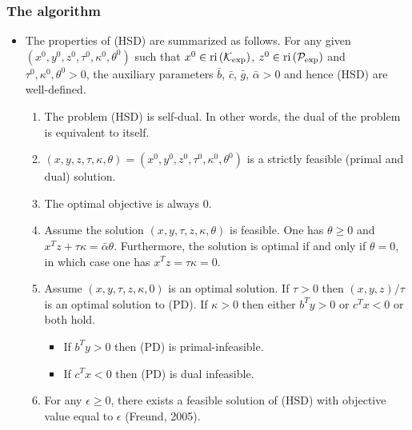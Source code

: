 \documentclass{beamer}
\def\interior{\protect{\textnormal{ri}}}
\begin{document}
\begin{frame}
	\frametitle{The algorithm}
	\begin{itemize}
		\item The properties of (HSD) are summarized as follows.
			For any given $(x^0, y^0, z^0, \tau^0, \kappa^0, \theta^0)$ such that $x^0 \in \interior \left(\mathcal{K}_{\exp}\right)$, $z^0 \in \interior \left(\mathcal{P}_{\exp}\right)$ and $\tau^0, \kappa^0, \theta^0 > 0$, the auxiliary parameters $\bar{b}$, $\bar{c}$, $\bar{g}$, $\bar{\alpha}>0$ and hence (HSD) are well-defined.
			\begin{enumerate}
				\item The problem (HSD) is \textnormal{self-dual}. In other words, the dual of the problem is equivalent to itself. 
				\item $(x,y,z,\tau,\kappa, \theta) = (x^0,y^0,z^0, \tau^0,\kappa^0, \theta^0)$ is a strictly feasible (primal and dual) solution.
				\item The optimal objective is always 0. 
				\item Assume the solution $(x,y, \tau, z,\kappa, \theta)$ is feasible. One has $\theta\geq 0$ and $x^T z + \tau \kappa = \bar{\alpha} \theta$. Furthermore, the solution is optimal if and only if $\theta=0$, in which case one has $x^T z = \tau\kappa = 0$.
				\item Assume $(x,y, \tau, z,\kappa, 0)$ is an optimal solution. If $\tau>0$ then $(x,y,z)/\tau$ is an optimal solution to (PD). If $\kappa>0$ then either $b^Ty>0$ or $c^Tx<0$ or both hold. 
				\begin{itemize}
					\item If $b^T y>0$ then (PD) is primal-infeasible.
					\item If $c^T x < 0$ then (PD) is dual infeasible.
				\end{itemize}
				\item For any $\epsilon \geq 0$, there exists a feasible solution of (HSD) with objective value equal to $\epsilon$ (Freund, 2005).
			\end{enumerate}
	\end{itemize}
\end{frame}
\end{document}
